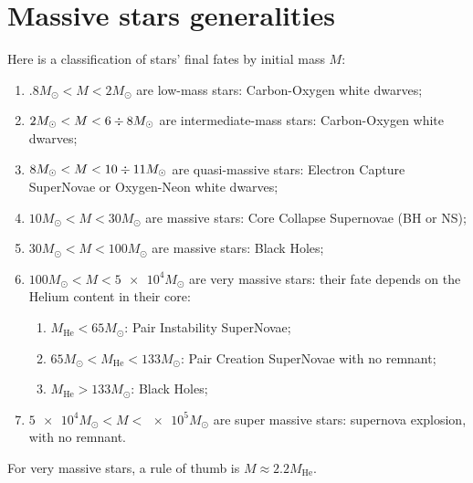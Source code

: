 \documentclass[main.tex]{subfiles}
\begin{document}

\section{Massive stars generalities}


Here is a classification of stars' final fates by initial mass \(M\): 
\begin{enumerate}
    \item \(\num{.8} M_{\odot} < M < \num{2} M_{\odot}\) are low-mass stars: Carbon-Oxygen white dwarves;
    \item \(\num{2} M_{\odot} < M < 6 \divisionsymbol 8 M_{\odot}\) are intermediate-mass stars: Carbon-Oxygen white dwarves;
    \item \(\num{8} M_{\odot} < M < 10 \divisionsymbol 11 M_{\odot}\) are quasi-massive stars: Electron Capture SuperNovae or Oxygen-Neon white dwarves;
    \item \(10 M_{\odot} < M < 30 M_{\odot}\) are massive stars: Core Collapse Supernovae (BH or NS);
    \item \(30 M_{\odot} < M < 100 M_{\odot}\) are massive stars: Black Holes;
    \item \(100 M_{\odot} < M < \num{5e4} M_{\odot}\) are very massive stars: their fate depends on the Helium content in their core: \begin{enumerate}
        \item \(M _{\text{He}} < 65 M_{\odot}\): Pair Instability SuperNovae;
        \item \(65 M_{\odot} < M _{\text{He}} < 133 M_{\odot}\): Pair Creation SuperNovae with no remnant;
        \item \(M _{\text{He}} > 133 M_{\odot}\): Black Holes;
    \end{enumerate}
    \item \(\num{5e4} M_{\odot} < M < \num{e5} M_{\odot}\)  are super massive stars: supernova explosion, with no remnant.
\end{enumerate}

For very massive stars, a rule of thumb is \(M \approx 2.2 M _{\text{He}} \).

\end{document}
